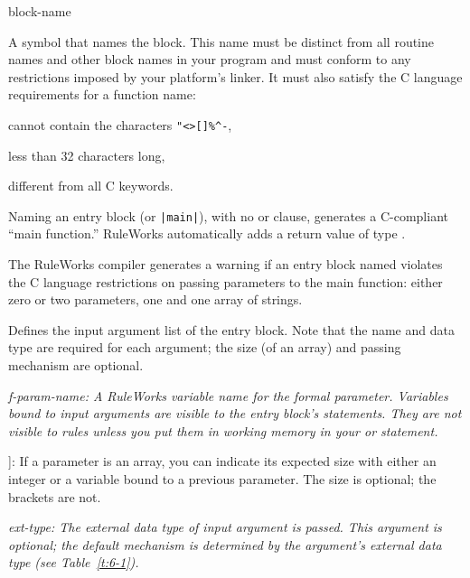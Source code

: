 
  

\begin{argument}
\item[block-name]

  A symbol that names the block. This name must be distinct from all
  routine names and other block names in your program and must conform
  to any restrictions imposed by your platform's linker. It must also
  satisfy the C language requirements for a function name:

  \qquad cannot contain the characters \verb,"<>[]%^-,,

  \qquad less than 32 characters long,

  \qquad different from all C keywords.
\end{argument}

\begin{note}
  Naming an entry block  (or \verb,|main|,), with no
   or  clause, generates a C-compliant ``main
  function.''  RuleWorks automatically adds a return value of type
  .
\end{note}

The RuleWorks compiler generates a warning if an entry block named
 violates the C language restrictions on passing parameters
to the main function: either zero or two parameters, one 
and one array of strings.

\Clauses


Defines the input argument list of the entry block. Note that the name
and data type are required for each argument; the size (of an array)
and passing mechanism are optional.

\it{f-param-name}: A RuleWorks variable name for the formal
parameter.
Variables bound to input arguments are visible
to the entry block's  statements. They are not
visible to rules unless you put them in working
memory in your  or  statement.

\co[[\it{size}]\co]: If a parameter is an array, you can indicate its
expected size with either an integer or a variable bound to a previous
parameter. The size is optional; the brackets are not.

\it{ext-type}: The external data type of input argument is
passed. This argument is optional; the default mechanism is determined
by the argument's external data type (see Table~\ref{t:6-1}).

